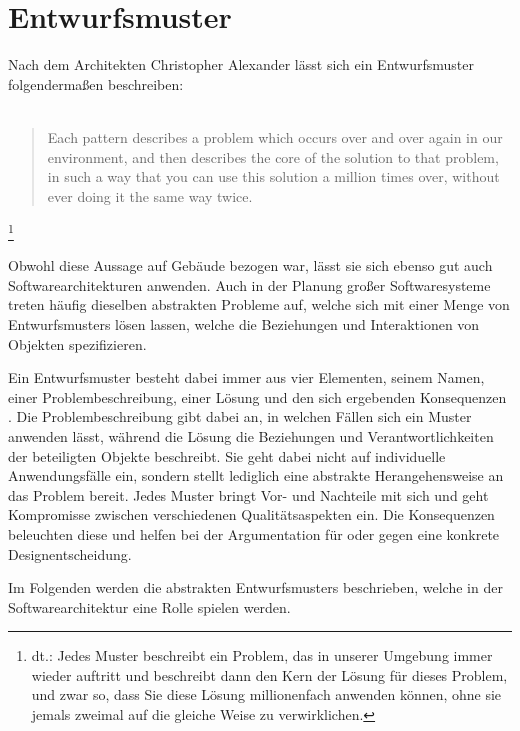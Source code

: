 \section{Entwurfsmuster}

Nach dem Architekten Christopher Alexander lässt sich ein Entwurfsmuster folgendermaßen beschreiben:\\
\\

\blockquote{Each pattern describes a problem which occurs over and over again in our environment, and then describes the core of the solution to that problem, in such a way that you can use this solution a million times over, without ever doing it the same way twice.}\footnote{dt.: Jedes Muster beschreibt ein Problem, das in unserer Umgebung immer wieder auftritt und beschreibt dann den Kern der Lösung für dieses Problem, und zwar so, dass Sie diese Lösung millionenfach anwenden können, ohne sie jemals zweimal auf die gleiche Weise zu verwirklichen.} \cite{gamma_design_1995}\\
\\

Obwohl diese Aussage auf Gebäude bezogen war, lässt sie sich ebenso gut auch Softwarearchitekturen anwenden. Auch in der Planung großer Softwaresysteme treten häufig dieselben abstrakten Probleme auf, welche sich mit einer Menge von Entwurfsmusters lösen lassen, welche die Beziehungen und Interaktionen von Objekten spezifizieren.

Ein Entwurfsmuster besteht dabei immer aus vier Elementen, seinem Namen, einer Problembeschreibung, einer Lösung und den sich ergebenden Konsequenzen \cite{gamma_design_1995}. Die Problembeschreibung gibt dabei an, in welchen Fällen sich ein Muster anwenden lässt, während die Lösung die Beziehungen und Verantwortlichkeiten der beteiligten Objekte beschreibt. Sie geht dabei nicht auf individuelle Anwendungsfälle ein, sondern stellt lediglich eine abstrakte Herangehensweise an das Problem bereit. Jedes Muster bringt Vor- und Nachteile mit sich und geht Kompromisse zwischen verschiedenen Qualitätsaspekten ein. Die Konsequenzen beleuchten diese und helfen bei der Argumentation für oder gegen eine konkrete Designentscheidung.

Im Folgenden werden die abstrakten Entwurfsmusters beschrieben, welche in der Softwarearchitektur eine Rolle spielen werden.







